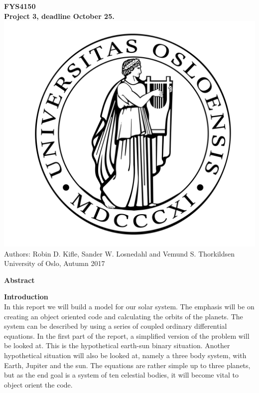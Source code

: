 \documentclass[10pt,a4paper]{article}
\begin{document}
\begin{center}
{\LARGE\bf
FYS4150\\
Project 3, deadline October 25.
}
 \includegraphics[scale=0.075]{uio.png}\\
Authors: Robin D. Kifle, Sander W. Losnedahl and Vemund S. Thorkildsen\\
University of Oslo, Autumn 2017

\vspace{3cm}
{\LARGE\bf
Abstract
}

\end{center}

\newpage

{\LARGE\bf
Introduction
}\\

\noindent In this report we will build a model for our solar system. The emphasis will be on creating an object oriented code and calculating the orbits of the planets. The system can be described by using a series of coupled ordinary differential equations. In the first part of the report, a simplified version of the problem will be looked at. This is the hypothetical earth-sun binary situation. Another hypothetical situation will also be looked at, namely a three body system, with Earth, Jupiter and the sun. The equations are rather simple up to three planets, but as the end goal is a system of ten celestial bodies, it will become vital to object orient the code.\\
\end{document}
